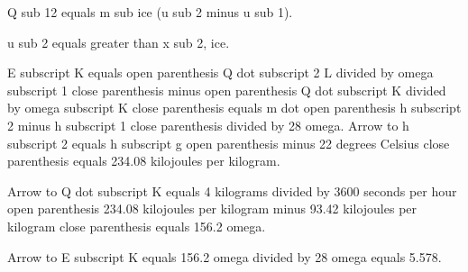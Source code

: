 Q sub 12 equals m sub ice (u sub 2 minus u sub 1).

u sub 2 equals greater than x sub 2, ice.

E subscript K equals open parenthesis Q dot subscript 2 L divided by omega subscript 1 close parenthesis minus open parenthesis Q dot subscript K divided by omega subscript K close parenthesis equals m dot open parenthesis h subscript 2 minus h subscript 1 close parenthesis divided by 28 omega. Arrow to h subscript 2 equals h subscript g open parenthesis minus 22 degrees Celsius close parenthesis equals 234.08 kilojoules per kilogram.

Arrow to Q dot subscript K equals 4 kilograms divided by 3600 seconds per hour open parenthesis 234.08 kilojoules per kilogram minus 93.42 kilojoules per kilogram close parenthesis equals 156.2 omega.

Arrow to E subscript K equals 156.2 omega divided by 28 omega equals 5.578.
